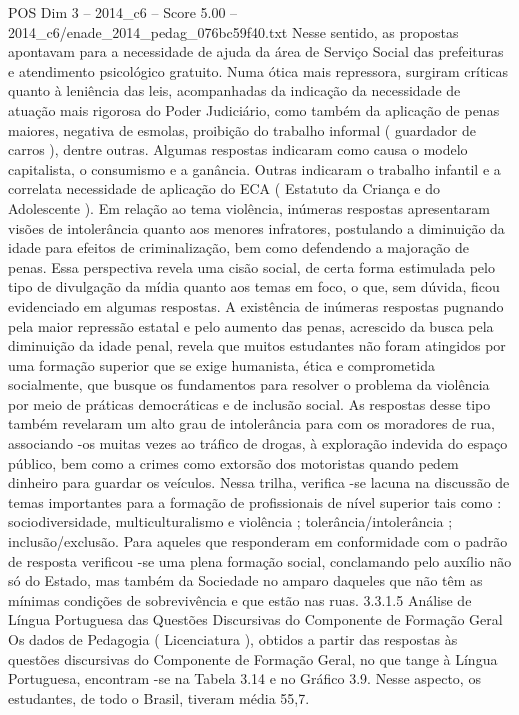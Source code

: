 \begin{textsample}{POS Dim 3 – 2014\_c6 – Score 5.00 – 2014\_c6/enade\_2014\_pedag\_076bc59f40.txt}
Nesse sentido, as propostas apontavam para a necessidade de ajuda da área de Serviço Social das prefeituras e atendimento psicológico gratuito.
Numa ótica mais repressora, surgiram críticas quanto à leniência das leis, acompanhadas da indicação da necessidade de atuação mais rigorosa do Poder Judiciário, como também da aplicação de penas maiores, negativa de esmolas, proibição do trabalho informal ( guardador de carros ), dentre outras.
Algumas respostas indicaram como causa o modelo capitalista, o consumismo e a ganância.
Outras indicaram o trabalho infantil e a correlata necessidade de aplicação do ECA ( Estatuto da Criança e do Adolescente ).
Em relação ao tema violência, inúmeras respostas apresentaram visões de intolerância quanto aos menores infratores, postulando a diminuição da idade para efeitos de criminalização, bem como defendendo a majoração de penas.
Essa perspectiva revela uma cisão social, de certa forma estimulada pelo tipo de divulgação da mídia quanto aos temas em foco, o que, sem dúvida, ficou evidenciado em algumas respostas.
A existência de inúmeras respostas pugnando pela maior repressão estatal e pelo aumento das penas, acrescido da busca pela diminuição da idade penal, revela que muitos estudantes não foram atingidos por uma formação superior que se exige humanista, ética e comprometida socialmente, que busque os fundamentos para resolver o problema da violência por meio de práticas democráticas e de inclusão social.
As respostas desse tipo também revelaram um alto grau de intolerância para com os moradores de rua, associando -os muitas vezes ao tráfico de drogas, à exploração indevida do espaço público, bem como a crimes como extorsão dos motoristas quando pedem dinheiro para guardar os veículos.
Nessa trilha, verifica -se lacuna na discussão de temas importantes para a formação de profissionais de nível superior tais como : sociodiversidade, multiculturalismo e violência ; tolerância/intolerância ; inclusão/exclusão.
Para aqueles que responderam em conformidade com o padrão de resposta verificou -se uma plena formação social, conclamando pelo auxílio não só do Estado, mas também da Sociedade no amparo daqueles que não têm as mínimas condições de sobrevivência e que estão nas ruas. 3.3.1.5 Análise de Língua Portuguesa das Questões Discursivas do Componente de Formação Geral Os dados de Pedagogia ( Licenciatura ), obtidos a partir das respostas às questões discursivas do Componente de Formação Geral, no que tange à Língua Portuguesa, encontram -se na Tabela 3.14 e no Gráfico 3.9.
Nesse aspecto, os estudantes, de todo o Brasil, tiveram média 55,7.

\end{textsample}
